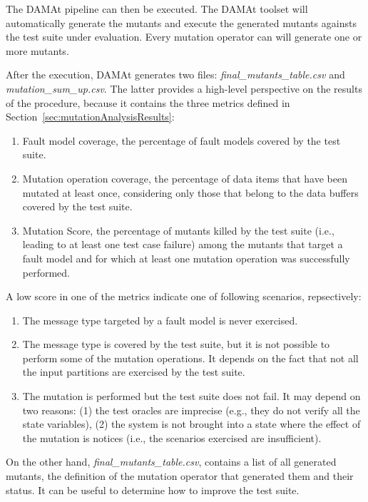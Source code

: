 The DAMAt pipeline can then be executed. The DAMAt toolset will automatically generate the mutants and execute the generated mutants againsts the test suite under evaluation.
Every mutation operator can will generate one or more mutants.

\ENDCHANGEDFINAL


After the execution, DAMAt generates two files: \emph{final\_mutants\_table.csv} and \emph{mutation\_sum\_up.csv}.
The latter provides a high-level perspective on the results of the procedure, because it contains the three metrics defined in Section~\ref{sec:mutationAnalysisResults}:
\begin{enumerate}
\item Fault model coverage, the percentage of fault models covered by the test suite.
\item Mutation operation coverage, the percentage of data items that have been mutated at least once, considering only those that belong to the data buffers covered by the test suite.
\item Mutation Score, the percentage of mutants killed by the test suite (i.e., leading to at least one test case failure) among the mutants that target a fault model and for which at least one mutation operation was successfully performed.
\end{enumerate}


A low score in one of the metrics indicate one of following scenarios, repsectively:
\begin{enumerate}
\item The message type targeted by a fault model is never exercised.
\item The message type is covered by the test suite, but it is not possible to perform some of the mutation operations. It depends on the fact that not all the input partitions are exercised by the test suite.
\item The mutation is performed but the test suite does not fail. It may depend on two reasons: (1) the test oracles are imprecise (e.g., they do not verify all the state variables), (2) the system is not brought into a state where the effect of the mutation is notices (i.e., the scenarios exercised are insufficient).
\end{enumerate}

\STARTCHANGEDFINAL

On the other hand, \emph{final\_mutants\_table.csv}, contains a list of all generated mutants, the definition of the mutation operator that generated them and their status. It can be useful to determine how to improve the test suite.

